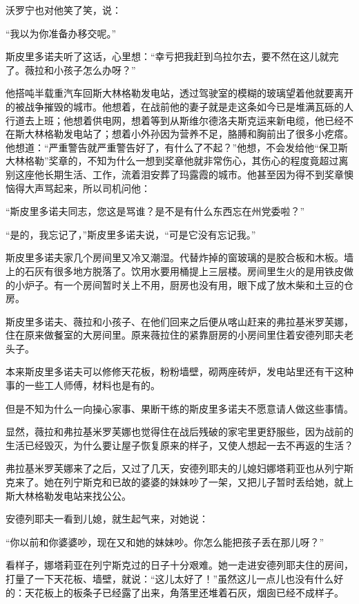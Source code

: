 沃罗宁也对他笑了笑，说：

“我以为你准备办移交呢。”

斯皮里多诺夫听了这话，心里想：“幸亏把我赶到乌拉尔去，要不然在这儿就完了。薇拉和小孩子怎么办呀？”

他搭吨半载重汽车回斯大林格勒发电站，透过驾驶室的模糊的玻璃望着他就要离开的被战争摧毁的城市。他想着，在战前他的妻子就是走这条如今已是堆满瓦砾的人行道去上班；他想着供电网，想着等到从斯维尔德洛夫斯克运来新电缆，他已经不在斯大林格勒发电站了；想着小外孙因为营养不足，胳膊和胸前出了很多小疙瘩。他想道：“严重警告就严重警告好了，有什么了不起？”他想，不会发给他“保卫斯大林格勒”奖章的，不知为什么一想到奖章他就非常伤心，其伤心的程度竟超过离别这座他长期生活、工作，流着泪安葬了玛露霞的城市。他甚至因为得不到奖章懊恼得大声骂起来，所以司机问他：

“斯皮里多诺夫同志，您这是骂谁？是不是有什么东西忘在州党委啦？”

“是的，我忘记了，”斯皮里多诺夫说，“可是它没有忘记我。”

斯皮里多诺夫家几个房间里又冷又潮湿。代替炸掉的窗玻璃的是胶合板和木板。墙上的石灰有很多地方脱落了。饮用水要用桶提上三层楼。房间里生火的是用铁皮做的小炉子。有一个房间暂时关上不用，厨房也没有用，眼下成了放木柴和土豆的仓房。

斯皮里多诺夫、薇拉和小孩子、在他们回来之后便从喀山赶来的弗拉基米罗芙娜，住在原来做餐室的大房间里。原来薇拉住的紧靠厨房的小房间里住着安德列耶夫老头子。

本来斯皮里多诺夫可以修修天花板，粉粉墙壁，砌两座砖炉，发电站里还有干这种事的一些工人师傅，材料也是有的。

但是不知为什么一向操心家事、果断干练的斯皮里多诺夫不愿意请人做这些事情。

显然，薇拉和弗拉基米罗芙娜也觉得住在战后残破的家宅里更舒服些，因为战前的生活已经毁灭，为什么要让屋子恢复原来的样子，又使人想起一去不再返的生活？

弗拉基米罗芙娜来了之后，又过了几天，安德列耶夫的儿媳妇娜塔莉亚也从列宁斯克来了。她在列宁斯克和已故的婆婆的妹妹吵了一架，又把儿子暂时丢给她，就上斯大林格勒发电站来找公公。

安德列耶夫一看到儿媳，就生起气来，对她说：

“你以前和你婆婆吵，现在又和她的妹妹吵。你怎么能把孩子丢在那儿呀？”

看样子，娜塔莉亚在列宁斯克过的日子十分艰难。她一走进安德列耶夫住的房间，打量了一下天花板、墙壁，就说：“这儿太好了！”虽然这儿一点儿也没有什么好的：天花板上的板条子已经露了出来，角落里还堆着石灰，烟囱已经不成样子。

